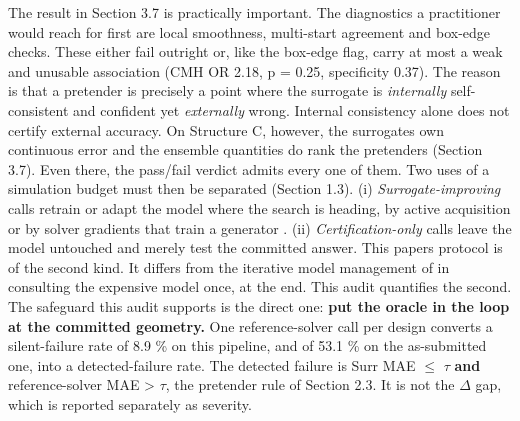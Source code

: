 \documentclass[11pt,a4paper]{article}
\begin{document}
The result in Section 3.7 is practically important. The diagnostics a practitioner would
reach for first are local smoothness, multi-start agreement and box-edge checks. These
either fail outright or, like the box-edge flag, carry at most a weak and unusable
association (CMH OR 2.18, p = 0.25, specificity 0.37). The reason is that a pretender is
precisely a point where the surrogate is \emph{internally} self-consistent and confident yet
\emph{externally} wrong. Internal consistency alone does not certify external accuracy. On
Structure C, however, the surrogate\textquotesingle s own continuous error and the ensemble quantities do
rank the pretenders (Section 3.7). Even there, the pass/fail verdict admits every one of
them. Two uses of a simulation budget must then be separated (Section 1.3).
(i) \emph{Surrogate-improving} calls retrain or adapt the model where the search is heading, by
active acquisition \cite{pestourie202032} or by solver gradients that train a generator \cite{jiang201933}.
(ii) \emph{Certification-only} calls leave the model untouched and merely test the committed
answer. This paper\textquotesingle s protocol is of the second kind. It differs from the iterative model
management of \cite{alexandrov199817,booker199918} in consulting the expensive model once, at the end. This audit
quantifies the second. The safeguard this audit supports is the direct one: \textbf{put the
oracle in the loop at the committed geometry.}
One reference-solver call per design converts a silent-failure rate of 8.9 \% on this pipeline, and of 53.1 \% on the as-submitted one, into a detected-failure rate.
The detected failure is Surr MAE \ensuremath{\leq} \ensuremath{\tau} \textbf{and} reference-solver MAE \textgreater{} \ensuremath{\tau}, the pretender rule
of Section 2.3. It is not the \ensuremath{\Delta} gap, which is reported separately as severity.
\end{document}
